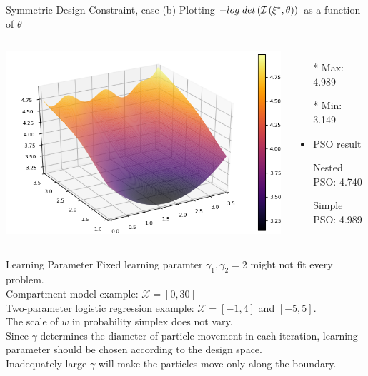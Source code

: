 \documentclass{beamer}
\begin{document}
\begin{frame}{Symmetric Design Constraint, case (b)}
  Plotting $-log \hspace{1mm} det \left( \mathcal{I} \left( \xi^*,\theta \right) \right)$ as a function of $\theta$\\
  \begin{columns}
    \begin{center}
      \includegraphics[scale=0.5]{surfaceb.png}
    \end{center}
    \begin{itemize}
      \item[*] Max: 4.989
      \item[*] Min: 3.149
      \vspace{5mm}
      \item PSO result
      \item[] Nested PSO: 4.740
      \item[] Simple PSO: 4.989
    \end{itemize}
  \end{columns}
\end{frame}

\begin{frame}{Learning Parameter}
    Fixed learning paramter $\gamma_1, \gamma_2=2$ might not fit every problem.\\
  \vspace{3mm}
  Compartment model example: $\mathcal{X}=[0,30]$\\
  Two-parameter logistic regression example: $\mathcal{X}=[-1,4]$ and $[-5,5]$.\\
  \vspace{3mm}
  The scale of $w$ in probability simplex does not vary.\\
  \vspace{3mm}
  Since $\gamma$ determines the diameter of particle movement in each iteration, learning parameter should be chosen according to the design space.\\
  \vspace{3mm}
  Inadequately large $\gamma$ will make the particles move only along the boundary.
\end{frame}
\end{document}

